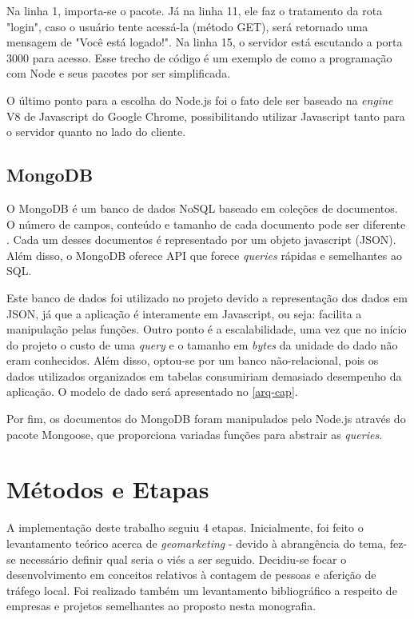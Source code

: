 Na linha 1, importa-se o pacote. Já na linha 11, ele faz o tratamento da rota "login", caso o usuário tente acessá-la (método GET), será retornado uma mensagem de "Você está logado!". Na linha 15, o servidor está escutando a porta 3000 para acesso. Esse trecho de código é um exemplo de como a programação
com Node e seus pacotes por ser simplificada.

O último ponto para a escolha do Node.js foi o fato dele ser baseado na \emph{engine} V8 de Javascript do Google Chrome, possibilitando utilizar Javascript tanto para o servidor quanto no lado do cliente.

\subsection{MongoDB}
O MongoDB é um banco de dados NoSQL baseado em coleções de documentos. O número
de campos, conteúdo e tamanho de cada documento pode ser diferente \cite{mongo}.
Cada um desses documentos é representado por um objeto javascript (JSON). Além
disso, o MongoDB oferece API que forece \emph{queries} rápidas e semelhantes ao
SQL.

Este banco de dados foi utilizado no projeto devido a representação dos dados em
JSON, já que a aplicação é interamente em Javascript, ou seja: facilita a
manipulação pelas funções. Outro ponto é a escalabilidade, uma vez que no início
do projeto o custo de uma \emph{query} e o tamanho em \emph{bytes} da unidade do
dado não eram conhecidos. Além disso, optou-se por um banco não-relacional, pois os dados utilizados organizados em tabelas consumiriam demasiado desempenho da aplicação. O modelo de dado será apresentado no \autoref{arq-cap}.

Por fim, os documentos do MongoDB foram manipulados pelo Node.js através do pacote Mongoose, que proporciona variadas
funções para abstrair as \emph{queries}.

\section{Métodos e Etapas}
\label{metodos-etapas}

A implementação deste trabalho seguiu 4 etapas. Inicialmente, foi feito o levantamento teórico acerca de \emph{geomarketing} - devido à abrangência do tema, fez-se necessário definir
qual seria o viés a ser seguido. Decidiu-se focar o desenvolvimento em conceitos
relativos à contagem de pessoas e aferição de tráfego local. Foi realizado
também um levantamento bibliográfico a respeito de empresas e projetos
semelhantes ao proposto nesta monografia.

